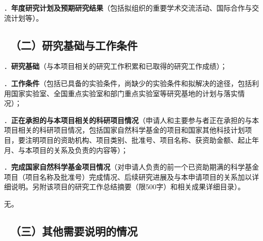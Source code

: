 \documentclass[12pt,UTF8,AutoFakeBold=3,a4paper]{ctexart} %
\newcommand{\sihao}{\fontsize{14pt}{\baselineskip}\selectfont}
\begin{document}



{\sihao \color{MsBlue} ．{\bfseries 年度研究计划及预期研究结果}（包括拟组织的重要学术交流活动、国际合作与交流计划等）。}





{\color{MsBlue} \subsection{\sihao \kaishu \quad \ （二）研究基础与工作条件 }}

{\sihao \color{MsBlue} ．{\bfseries 研究基础}（与本项目相关的研究工作积累和已取得的研究工作成绩）；}



\vspace{0.5 \baselineskip}
{\sihao \color{MsBlue} ．{\bfseries 工作条件}（包括已具备的实验条件，尚缺少的实验条件和拟解决的途径，包括利用国家实验室、全国重点实验室和部门重点实验室等研究基地的计划与落实情况）；}
\vspace{0.5 \baselineskip}



{\sihao \color{MsBlue} ．{\bfseries 正在承担的与本项目相关的科研项目情况}（申请人和主要参与者正在承担的与本项目相关的科研项目情况，包括国家自然科学基金的项目和国家其他科技计划项目，要注明项目的资助机构、项目类别、批准号、项目名称、获资助金额、起止年月、与本项目的关系及负责的内容等）；}



{\sihao \color{MsBlue} ．{\bfseries 完成国家自然科学基金项目情况}（对申请人负责的前一个已资助期满的科学基金项目（项目名称及批准号）完成情况、后续研究进展及与本申请项目的关系加以详细说明。另附该项目的研究工作总结摘要（限500字）和相关成果详细目录）。}

\vspace{0.25 \baselineskip}
{\kaishu 无。}

{\color{MsBlue} \subsection{\sihao \kaishu \quad \ （三）其他需要说明的情况 }}
\end{document}
